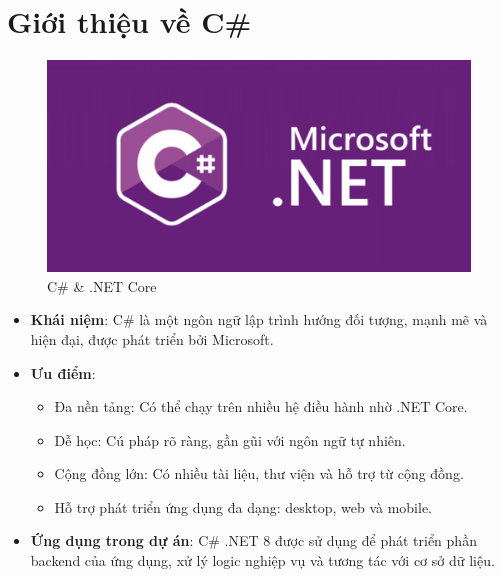 \documentclass[../index.tex]{subfiles}
\begin{document}
    \section{Giới thiệu về C\#}
    \begin{figure}[H]
        \centering
        \includegraphics[width=0.6\linewidth]{figures/tech-logo/csharp-dotnet.png}
        \caption{C\# \& .NET Core}
    \end{figure}
    \begin{itemize}
        \item \textbf{Khái niệm}: C\# là một ngôn ngữ lập trình hướng đối tượng,
            mạnh mẽ và hiện đại, được phát triển bởi Microsoft.

        \item \textbf{Ưu điểm}:
            \begin{itemize}
                \item Đa nền tảng: Có thể chạy trên nhiều hệ điều hành nhờ .NET Core.

                \item Dễ học: Cú pháp rõ ràng, gần gũi với ngôn ngữ tự nhiên.

                \item Cộng đồng lớn: Có nhiều tài liệu, thư viện và hỗ trợ từ cộng
                    đồng.

                \item Hỗ trợ phát triển ứng dụng đa dạng: desktop, web và mobile.
            \end{itemize}

        \item \textbf{Ứng dụng trong dự án}: C\# .NET 8 được sử dụng để phát triển
            phần backend của ứng dụng, xử lý logic nghiệp vụ và tương tác với cơ
            sở dữ liệu.
    \end{itemize}

\end{document}
